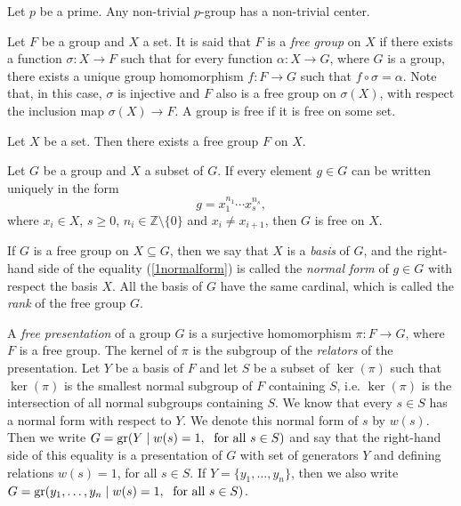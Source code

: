 \begin{theorem}
    Let $p$ be a prime. Any non-trivial $p$-group has a non-trivial center.
\end{theorem}

Let $F$ be a group and $X$ a set. It is said that $F$ is a \emph{free group} 
on $X$ if there exists a function
$\sigma\colon X\rightarrow F$ such that for every function $\alpha\colon X\rightarrow G$, where $G$ is a group, there exists 
a unique group homomorphism $f\colon F\rightarrow G$ such that $f\circ \sigma=\alpha$. Note that, in this case, 
$\sigma$ is injective and $F$ also is a free group on $\sigma(X)$, with respect the inclusion map $\sigma(X)\rightarrow F$.
A group is free if it is free on some set.

\begin{theorem}
    Let $X$ be a set. Then there exists a free group $F$ on $X$.
\end{theorem}

\begin{proposition}
    Let $G$ be a group and $X$ a subset of $G$. If every element $g\in G$ can be written uniquely in the form
    \begin{equation}\label{1normalform}
    g=x_1^{n_1}\cdots x_s^{n_s},
    \end{equation}
    where $x_i\in X$, $s\geq 0$, $n_i\in \mathbb{Z}\setminus \{0\}$ and $x_i\neq x_{i+1}$, then $G$ is free on $X$. 
\end{proposition}

If $G$ is a free group on $X\subseteq G$, then we say that $X$ is a {\em basis} of $G$, and the right-hand side of the equality (\ref{1normalform}) is called the {\em normal form} of $g\in G$ with respect the basis $X$. All the basis of $G$ have the same cardinal,
which is called the {\em rank} of the free group $G$.

A {\em free presentation} of a group $G$ is a surjective homomorphism $\pi \colon F\rightarrow G$, where $F$ is a free group. The kernel of $\pi$ is the subgroup of the {\em relators} of the presentation. Let $Y$ be a basis of $F$ and let $S$ be a subset of $\ker(\pi)$ such that $\ker(\pi)$ is the smallest normal subgroup of $F$ containing $S$, i.e. $\ker(\pi)$ is the intersection of all normal subgroups containing $S$. We know that every $s\in S$ has a normal form with respect to $Y$. We denote this normal form of $s$ by $w(s)$. Then we write
$G=\operatorname{gr}(Y\mid w(s)=1,\;\mbox{ for all }s\in S)$ and say that the right-hand side of this equality is a presentation of $G$ with set of generators $Y$ and defining relations $w(s)=1$, for all $s\in S$. If $Y=\{ y_1,\dots, y_n\}$, then we also write
$G=\operatorname{gr}(y_1,\dots, y_n\mid w(s)=1,\;\mbox{ for all }s\in S)$.

